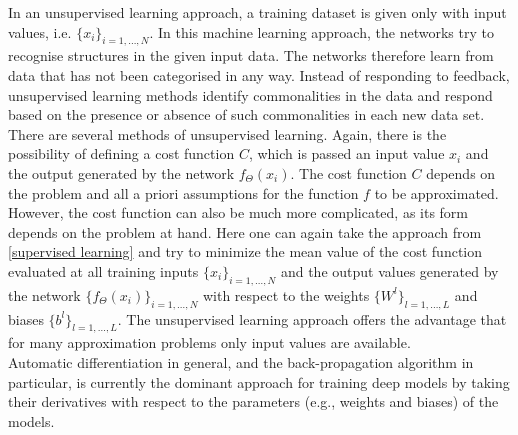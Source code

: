 In an unsupervised learning approach, a training dataset is given only with input values, i.e. $\{ x_i \}_{i = 1, \ldots, N}$. In this machine learning approach, the networks try to recognise structures in the given input data. The networks therefore learn from data that has not been categorised in any way. Instead of responding to feedback, unsupervised learning methods identify commonalities in the data and respond based on the presence or absence of such commonalities in each new data set. There are several methods of unsupervised learning. Again, there is the possibility of defining a cost function $C$, which is passed an input value $x_i$ and the output generated by the network $f_{\Theta}(x_i)$. The cost function $C$ depends on the problem and all a priori assumptions for the function $f$ to be approximated. However, the cost function can also be much more complicated, as its form depends on the problem at hand. Here one can again take the approach from \cref{supervised learning} and try to minimize the mean value of the cost function evaluated at all training inputs $\{ x_i \}_{i = 1, \ldots, N}$ and the output values generated by the network $\{ f_{\Theta}(x_i) \}_{i = 1, \ldots, N}$ with respect to the weights $\{ W^l \}_{l = 1, \ldots, L}$ and biases $\{ b^l \}_{l = 1, \ldots, L}$. The unsupervised learning approach offers the advantage that for many approximation problems only input values are available. \\

Automatic differentiation in general, and the back-propagation algorithm in particular, is currently the dominant approach for training deep models by taking their derivatives with respect to the parameters (e.g., weights and biases) of the models.


